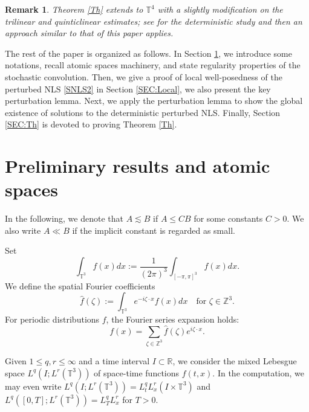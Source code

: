 \documentclass[letterpaper, 11pt,  reqno]{amsart}
\newtheorem{remark}[theorem]{Remark}
\newcommand{\1}{\hspace{0.5mm}\text{I}\hspace{0.5mm}}
\newcommand{\Z}{\mathbb{Z}}
\newcommand{\R}{\mathbb{R}}
\newcommand{\T}{\mathbb{T}}
\newcommand{\ft}{\widehat}
\numberwithin{equation}{section}
\numberwithin{theorem}{section}
\begin{document}
\begin{remark}
\rm
Theorem \ref{Th} extends to $\T^4$ with a slightly modification on the trilinear and 
quinticlinear estimates;
see \cite{Y21} for the deterministic study and then an approach similar to that of this paper applies.

\end{remark}









The rest of the paper is organized as follows.
In Section \ref{SEC:pre}, 
we introduce some notations, 
recall atomic spaces machinery, 
and state  regularity properties of the stochastic convolution.
Then, we give a proof of local well-posedness of the perturbed NLS \eqref{SNLS2}
 in Section
\ref{SEC:Local},
we also present the key perturbation lemma. 
Next, we apply the perturbation lemma to show the global existence of solutions to the deterministic perturbed NLS.
Finally, Section
\ref{SEC:Th}
is devoted to proving Theorem \ref{Th}.












\section{Preliminary results and atomic spaces}
\label{SEC:pre}
In the following, we denote that $A\lesssim B$ if $A\leq CB$ for some constants $C > 0$. We also write $A\ll B$ if the implicit
constant is regarded as small.


Set
\[
\int_{\T^3} f(x) dx
:=
\frac 1{(2\pi)^3} \int_{[-\pi,\pi]^3} f(x) dx.
\]
We define the spatial Fourier coefficients
\begin{equation*}
    \widehat{f}(\zeta):= \int_{\T^{3}} e^{-i \zeta \cdot x}
f(x) dx
    \quad \text{for }\zeta \in \Z^{3}.
\end{equation*}
For periodic distributions $f$,
the Fourier series expansion holds:
\[
f(x) = \sum_{\zeta \in \Z^3} \ft f(\zeta) e^{i \zeta \cdot x}.
\]




Given $1 \le q,r\leq \infty$ and a time interval $I\subset\R$,
we consider the mixed Lebesgue space $L^q(I; L^r(\T^3))$ of space-time functions $f(t,x)$.
In the computation, we may even write $L^q (I; L^r(\T^3)) =L_t^q L_x^r (I \times \T^3)$
and $L^q([0,T]; L^r(\T^3)) = L_T^qL_x^r$ for $T>0$.
\end{document}
